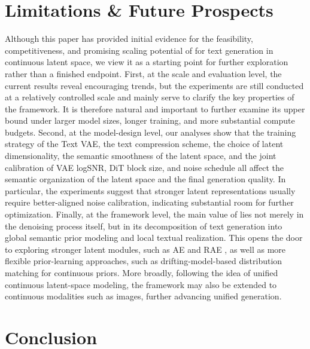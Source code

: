 \section{Limitations \& Future Prospects}

Although this paper has provided initial evidence for the feasibility, competitiveness, and promising scaling potential of \method for text generation in continuous latent space, we view it as a starting point for further exploration rather than a finished endpoint. First, at the scale and evaluation level, the current results reveal encouraging trends, but the experiments are still conducted at a relatively controlled scale and mainly serve to clarify the key properties of the framework. It is therefore natural and important to further examine its upper bound under larger model sizes, longer training, and more substantial compute budgets. Second, at the model-design level, our analyses show that the training strategy of the Text VAE, the text compression scheme, the choice of latent dimensionality, the semantic smoothness of the latent space, and the joint calibration of VAE logSNR, DiT block size, and noise schedule all affect the semantic organization of the latent space and the final generation quality. In particular, the experiments suggest that stronger latent representations usually require better-aligned noise calibration, indicating substantial room for further optimization. Finally, at the framework level, the main value of \method lies not merely in the denoising process itself, but in its decomposition of text generation into global semantic prior modeling and local textual realization. This opens the door to exploring stronger latent modules, such as AE \citep{bank2023autoencoders} and RAE \citep{zheng2025diffusion}, as well as more flexible prior-learning approaches, such as drifting-model-based \citep{deng2026generative} distribution matching for continuous priors. More broadly, following the idea of unified continuous latent-space modeling, the framework may also be extended to continuous modalities such as images, further advancing unified generation.

\section{Conclusion}

